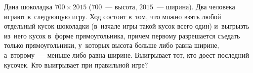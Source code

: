 \begin{problems}
\item
Дана шоколадка $700 \times 2015$ ($700$~--- высота, $2015$~--- ширина).
Два человека играют в~следующую игру.
Ход состоит в~том, что можно взять любой отдельный кусок шоколадки (в~начале
игры такой кусок всего один) и~выгрызть из~него кусок в~форме прямоугольника,
причем первому разрешается съедать только прямоугольники, у~которых высота
больше либо равна ширине, а~второму~--- меньше либо равна ширине.
Выигрывает тот, кто доест последний кусочек.
Кто выигрывает при правильной игре?

\end{problems}

